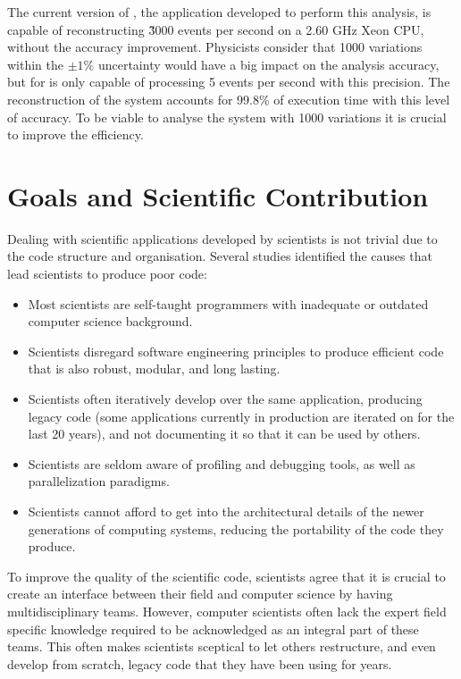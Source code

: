 The current version of \tth, the application developed to perform this analysis, is capable of reconstructing \~3000 events per second on a 2.60 GHz \intel Xeon CPU, without the accuracy improvement. Physicists consider that 1000 variations within the $\pm1\%$ uncertainty would have a big impact on the analysis accuracy, but for \tth is only capable of processing 5 events per second with this precision. The reconstruction of the \ttH system accounts for 99.8\% of \tth execution time with this level of accuracy. To be viable to analyse the \ttH system with 1000 variations it is crucial to improve the \tth efficiency.

\section{Goals and Scientific Contribution}
\label{goals}

Dealing with scientific applications developed by scientists is not trivial due to the code structure and organisation. Several studies \cite{SC:Nature,SC:Develop,SC:SC11,SC:28280} identified the causes that lead scientists to produce poor code:

\begin{center}
	\begin{itemize}
		\item Most scientists are self-taught programmers with inadequate or outdated computer science background.
		\item Scientists disregard software engineering principles to produce efficient code that is also robust, modular, and long lasting.
		\item Scientists often iteratively develop over the same application, producing legacy code (some applications currently in production are iterated on for the last 20 years), and not documenting it so that it can be used by others.
		\item Scientists are seldom aware of profiling and debugging tools, as well as parallelization paradigms.
		\item Scientists cannot afford to get into the architectural details of the newer generations of computing systems, reducing the portability of the code they produce.
	\end{itemize}
\end{center}

To improve the quality of the scientific code, scientists agree that it is crucial to create an interface between their field and computer science by having multidisciplinary teams. However, computer scientists often lack the expert field specific knowledge required to be acknowledged as an integral part of these teams. This often makes scientists sceptical to let others restructure, and even develop from scratch, legacy code that they have been using for years.

